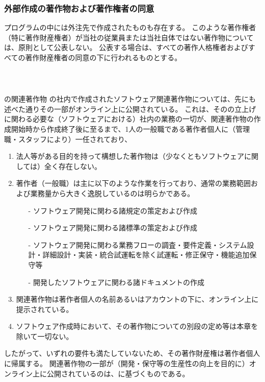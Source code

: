 \subsubsection{外部作成の著作物および著作権者の同意\label{subsec:copyrightsSubcontractor}}
プログラムの中には外注先で作成されたものも存在する。
このような著作権者（特に著作財産権者）が当社の従業員または当社自体ではない著作物については、原則として公表しない。
公表する場合は、すべての著作人格権者およびすべての著作財産権者の同意の下に行われるものとする。



\clearpage
~\vfill
\begin{Column}{\DMname の関連著作物}
\DMname の社内で作成されたソフトウェア関連著作物については、先にも述べた通りその一部がオンライン上に公開されている。
これは、その\DMname の立上げに関わる必要な（ソフトウェアにおける）社内の業務の一切が、関連著作物の作成開始時から作成終了後に至るまで、1人の一般職である著作者個人に（管理職・スタッフにより）一任されており、
\begin{enumerate}[label=\Roman*]
\item 法人等がある目的を持って構想した著作物は（少なくともソフトウェアに関しては）全く存在しない。
\item
著作者（一般職）は主に以下のような作業を行っており、通常の業務範囲および業務量から大きく逸脱しているのは明らかである。
  \begin{enumerate}
  \item[-] ソフトウェア開発に関わる諸規定の策定および作成
  \item[-] ソフトウェア開発に関わる諸標準の策定および作成
  \item[-] ソフトウェア開発に関わる業務フローの調査・要件定義・システム設計・詳細設計・実装・統合試運転を除く試運転・修正保守・機能追加保守等
  \item[-] 開発したソフトウェアに関わる諸ドキュメントの作成
  \end{enumerate}
\item 関連著作物は著作者個人の名前あるいはアカウントの下に、オンライン上に提示されている。
\item ソフトウェア作成時において、その著作物についての別段の定め等は本章を除いて一切ない。
\end{enumerate}
したがって、いずれの要件も満たしていないため、その著作財産権は著作者個人に帰属する。
関連著作物の一部が（開発・保守等の生産性の向上を目的に）オンライン上に公開されているのは、に基づくものである。
\end{Column}

